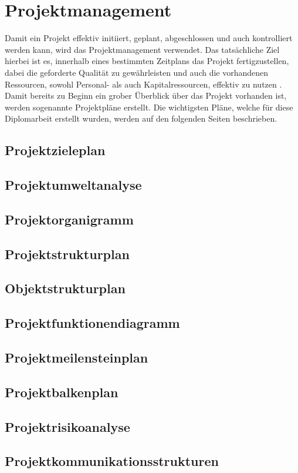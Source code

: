 \ifoot{\mangeng}
\chapter{Projektmanagement}
Damit ein Projekt effektiv initiiert, geplant, abgeschlossen und auch kontrolliert werden kann, wird das Projektmanagement verwendet. Das tatsächliche Ziel hierbei ist es, innerhalb eines bestimmten Zeitplans das Projekt fertigzustellen, dabei die geforderte Qualität zu gewährleisten und auch die vorhandenen Ressourcen, sowohl Personal- als auch Kapitalressourcen, effektiv zu nutzen \cite[vgl.][]{refa:o.J.}.\\
Damit bereits zu Beginn ein grober Überblick über das Projekt vorhanden ist, werden sogenannte Projektpläne erstellt. Die wichtigsten Pläne, welche für diese Diplomarbeit erstellt wurden, werden auf den folgenden Seiten beschrieben.
\section{Projektzieleplan}


\newpage
\newpage
\section{Projektumweltanalyse}


\section{Projektorganigramm}


\section{Projektstrukturplan}


\section{Objektstrukturplan}


\section{Projektfunktionendiagramm}


\section{Projektmeilensteinplan}


\section{Projektbalkenplan}


\section{Projektrisikoanalyse}


\section{Projektkommunikationsstrukturen}


